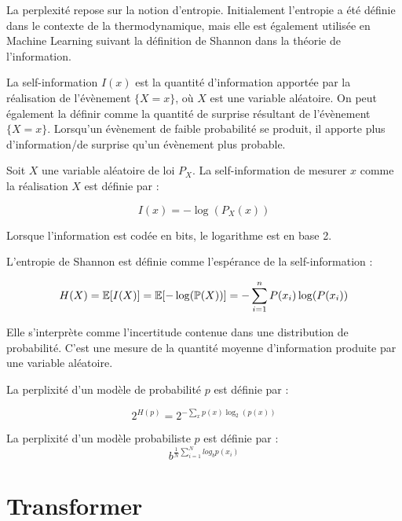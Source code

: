 La perplexité repose sur la notion d’entropie.
Initialement l’entropie a été définie dans le contexte de la thermodynamique,
mais elle est également utilisée en Machine Learning suivant la
définition de Shannon dans la théorie de l’information.

La self-information $I(x)$ est la quantité d’information apportée par la réalisation de
l’évènement $\{X=x\}$, où $X$ est une variable aléatoire. On peut également la définir
comme la quantité de \og surprise \fg{} résultant de l’évènement $\{X=x\}$. Lorsqu’un évènement de
faible probabilité se produit, il apporte plus d’information/de surprise
qu’un évènement plus probable.

\begin{definition}

  Soit $X$ une variable aléatoire de loi $P_X$. La self-information de mesurer $x$
  comme la réalisation $X$ est définie par :

  \[ I(x) = - \log\left(P_X(x)\right) \]

\end{definition}

Lorsque l'information est codée en bits, le logarithme est en base 2.

\begin{definition}
L'entropie de Shannon est définie comme l'espérance de la self-information :

  \[ H(X) = \mathbb{E}[I(X)] = \mathbb{E}[-\log(\mathbb{P}(X))] = - \sum_{i=1}^{n} P(x_i)\log(P(x_i)) \]
\end{definition}

Elle s'interprète comme l'incertitude contenue dans une distribution de probabilité.
C'est une mesure de la quantité moyenne d'information produite par une
variable aléatoire.

\begin{definition}
La perplixité d'un modèle de probabilité $p$ est définie par :

  \[ 2^{H(p)} = 2^{- \sum_{x}^{} p(x) \log_2(p(x))} \]
\end{definition}

\begin{definition}
La perplixité d'un modèle probabiliste $p$ est définie par :
  \[ b^{ \frac{1}{N} \sum_{i=1}^{N}  log_b p(x_i)} \]
\end{definition}

\newpage

\section{Transformer}

